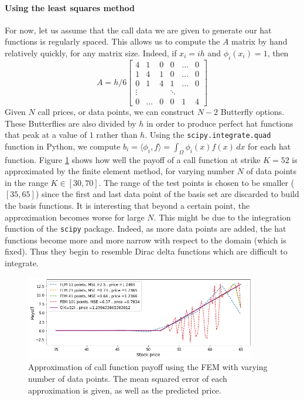 \documentclass[a4paper,12pt]{article}
\begin{document}
\paragraph{Using the least squares method}
For now, let us assume that the call data we are given to generate our hat functions is regularly spaced. This allows us to compute the $A$ matrix by hand relatively quickly, for any matrix size. Indeed, if $x_i = ih$ and $\phi_i(x_i) = 1$, then 
\begin{equation}
    A = h/6 \begin{bmatrix} 
    4 & 1 & 0 & 0 & \dots & 0 \\
    1 & 4 & 1 & 0 & \dots & 0\\
    0 & 1 & 4 & 1 & \dots & 0\\
    \vdots & & & \ddots & &  \\
    0 & \dots & 0 & 0 & 1 & 4 
    \end{bmatrix}
\end{equation}
Given $N$ call prices, or data points, we can construct $N-2$ Butterfly options. These Butterflies are also divided by $h$ in order to produce perfect hat functions that peak at a value of $1$ rather than $h$. Using the \texttt{scipy.integrate.quad} function in Python, we compute $b_i = \langle\phi_i,f\rangle = \int_{\Omega} \phi_i(x) f(x) \,dx$ for each hat function. Figure \ref{fig:fem_varying_N} shows how well the payoff of a call function at strike $K=52$ is approximated by the finite element method, for varying number $N$ of data points in the range $K \in [30, 70]$. The range of the test points is chosen to be smaller ($[35, 65]$) since the first and last data point of the basis set are discarded to build the basis functions. It is interesting that beyond a certain point, the approximation becomes worse for large $N$. This might be due to the integration function of the \texttt{scipy} package. Indeed, as more data points are added, the hat functions become more and more narrow with respect to the domain (which is fixed). Thus they begin to resemble Dirac delta functions which are difficult to integrate.

\begin{figure} [H]
    \centering
    \includegraphics[width=0.9\textwidth]{fem_approx_varying_N_hat.png}
    \caption{Approximation of call function payoff using the FEM with varying number of data points. The mean squared error of each approximation is given, as well as the predicted price.}
    \label{fig:fem_varying_N}
\end{figure}
\end{document}
